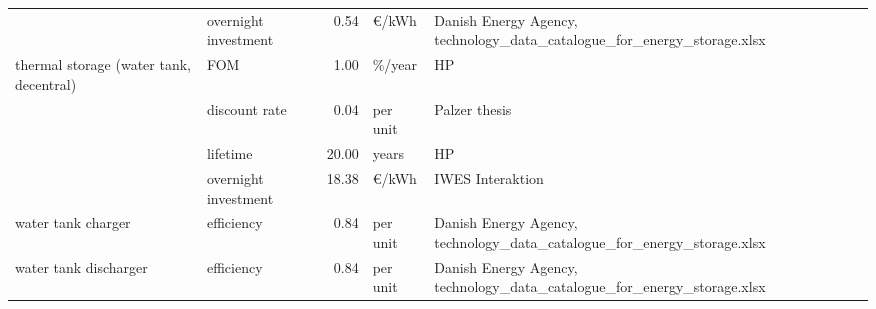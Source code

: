 \begin{longtable}{p{4cm}p{4cm}rp{3cm}p{10cm}}
                      & overnight investment &         0.54 &                     \euro/kWh &                                                                                                                                                                                                                                                         Danish Energy Agency, technology\_data\_catalogue\_for\_energy\_storage.xlsx \\
thermal storage (water tank, decentral) & FOM &         1.00 &                       \%/year &                                                                                                                                                                                                                                                                                                                                   HP \\
                      & discount rate &         0.04 &                      per unit &                                                                                                                                                                                                                                                                                                                        Palzer thesis \\
                      & lifetime &        20.00 &                         years &                                                                                                                                                                                                                                                                                                                                   HP \\
                      & overnight investment &        18.38 &                     \euro/kWh &                                                                                                                                                                                                                                                                                                                     IWES Interaktion \\
water tank charger & efficiency &         0.84 &                      per unit &                                                                                                                                                                                                                                                         Danish Energy Agency, technology\_data\_catalogue\_for\_energy\_storage.xlsx \\
water tank discharger & efficiency &         0.84 &                      per unit &                                                                                                                                                                                                                                                         Danish Energy Agency, technology\_data\_catalogue\_for\_energy\_storage.xlsx \\
\end{longtable}
